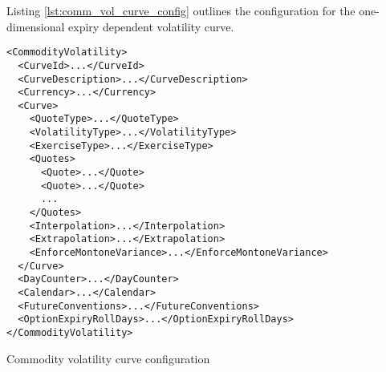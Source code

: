 Listing \ref{lst:comm_vol_curve_config} outlines the configuration for the one-dimensional expiry dependent volatility curve.

\begin{longlisting}
\begin{verbatim}
<CommodityVolatility>
  <CurveId>...</CurveId>
  <CurveDescription>...</CurveDescription>
  <Currency>...</Currency>
  <Curve>
    <QuoteType>...</QuoteType>
    <VolatilityType>...</VolatilityType>
    <ExerciseType>...</ExerciseType>
    <Quotes>
      <Quote>...</Quote>
      <Quote>...</Quote>
      ...
    </Quotes>
    <Interpolation>...</Interpolation>
    <Extrapolation>...</Extrapolation>
    <EnforceMontoneVariance>...</EnforceMontoneVariance>
  </Curve>
  <DayCounter>...</DayCounter>
  <Calendar>...</Calendar>
  <FutureConventions>...</FutureConventions>
  <OptionExpiryRollDays>...</OptionExpiryRollDays>
</CommodityVolatility>
\end{verbatim}
\caption{Commodity volatility curve configuration}
\label{lst:comm_vol_curve_config}
\end{longlisting}

